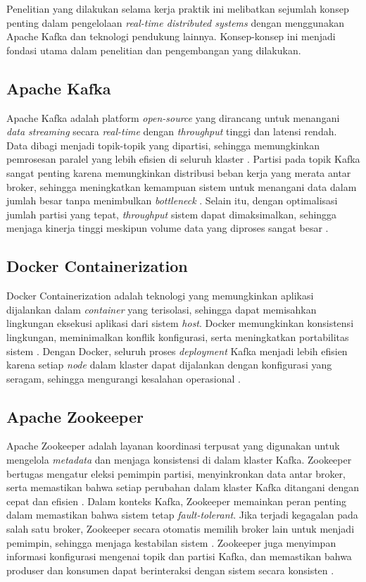Penelitian yang dilakukan selama kerja praktik ini melibatkan sejumlah konsep penting dalam pengelolaan \textit{real-time distributed systems} dengan menggunakan Apache Kafka dan teknologi pendukung lainnya. Konsep-konsep ini menjadi fondasi utama dalam penelitian dan pengembangan yang dilakukan.

\subsection{Apache Kafka}

Apache Kafka adalah platform \textit{open-source} yang dirancang untuk menangani \textit{data streaming} secara \textit{real-time} dengan \textit{throughput} tinggi dan latensi rendah. Data dibagi menjadi topik-topik yang dipartisi, sehingga memungkinkan pemrosesan paralel yang lebih efisien di seluruh klaster \citep{elsevier:kafka}. Partisi pada topik Kafka sangat penting karena memungkinkan distribusi beban kerja yang merata antar broker, sehingga meningkatkan kemampuan sistem untuk menangani data dalam jumlah besar tanpa menimbulkan \textit{bottleneck} \citep{elsevier:kafka}. Selain itu, dengan optimalisasi jumlah partisi yang tepat, \textit{throughput} sistem dapat dimaksimalkan, sehingga menjaga kinerja tinggi meskipun volume data yang diproses sangat besar \citep{elsevier:kafka}.

\subsection{Docker Containerization}

Docker Containerization adalah teknologi yang memungkinkan aplikasi dijalankan dalam \textit{container} yang terisolasi, sehingga dapat memisahkan lingkungan eksekusi aplikasi dari sistem \textit{host}. Docker memungkinkan konsistensi lingkungan, meminimalkan konflik konfigurasi, serta meningkatkan portabilitas sistem \citep{its:docker}. Dengan Docker, seluruh proses \textit{deployment} Kafka menjadi lebih efisien karena setiap \textit{node} dalam klaster dapat dijalankan dengan konfigurasi yang seragam, sehingga mengurangi kesalahan operasional \citep{its:docker}.

\subsection{Apache Zookeeper}

Apache Zookeeper adalah layanan koordinasi terpusat yang digunakan untuk mengelola \textit{metadata} dan menjaga konsistensi di dalam klaster Kafka. Zookeeper bertugas mengatur eleksi pemimpin partisi, menyinkronkan data antar broker, serta memastikan bahwa setiap perubahan dalam klaster Kafka ditangani dengan cepat dan efisien \citep{comp:zookeeper}. Dalam konteks Kafka, Zookeeper memainkan peran penting dalam memastikan bahwa sistem tetap \textit{fault-tolerant}. Jika terjadi kegagalan pada salah satu broker, Zookeeper secara otomatis memilih broker lain untuk menjadi pemimpin, sehingga menjaga kestabilan sistem \citep{comp:zookeeper}. Zookeeper juga menyimpan informasi konfigurasi mengenai topik dan partisi Kafka, dan memastikan bahwa produser dan konsumen dapat berinteraksi dengan sistem secara konsisten \citep{comp:zookeeper}.


